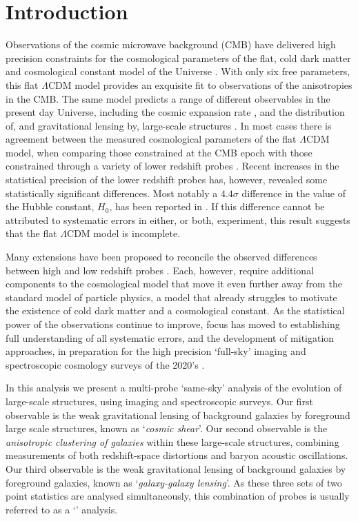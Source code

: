 \section{Introduction}
\label{sec:intro}

Observations of the cosmic microwave background (CMB) have delivered high precision
constraints for the cosmological parameters of the flat, cold dark
matter and cosmological constant model of the Universe
\citep[$\Lambda$CDM,][]{planck/etal:2018}.  With only six free
parameters, this flat $\Lambda$CDM model provides an exquisite fit to observations of
the anisotropies in the CMB.    The same model predicts a range of
different observables in the present day Universe, including the cosmic expansion rate \citep{weinberg/1972}, and the
distribution of, and gravitational lensing by, large-scale
structures \citep{peebles/1980,bartelmann/schneider:2001,eisenstein/etal:2005}.  
In most cases there
is agreement between the measured cosmological parameters of the flat $\Lambda$CDM model, when comparing those
constrained at the CMB epoch with those constrained through a variety of
lower redshift probes \citep[see the discussion in][and references
therein]{planck/etal:2018}.   Recent increases in the statistical
precision of the lower redshift probes has,
however, revealed some statistically significant differences.  Most
notably a $4.4\sigma$ difference in the value of the Hubble constant,
$H_0$, has been reported in \citet{riess/etal:2019}.  If this difference cannot be
attributed to systematic errors in either, or both, experiment, this result
suggests that the flat $\Lambda$CDM model is incomplete.

Many
extensions have been proposed to reconcile the observed differences between
high and low redshift probes \citep[see for
example][]{poulin/etal:2018,divalentino/etal:2020}.  Each, however, require
additional components
to the cosmological model that move it even further away from the
standard model of particle physics, a model that already struggles to motivate
the existence of cold dark matter and a cosmological constant.  
As the statistical power of the observations continue to improve, focus has moved to establishing
full understanding of all systematic errors, and the development of mitigation approaches, 
in preparation for the high precision `full-sky' imaging and spectroscopic
cosmology surveys of the 2020's \citep[Euclid,][]{laureijs/etal:2011,lsst/etal:2009,DESI/etal:2016}.

In this analysis we present a multi-probe `same-sky' analysis of the
evolution of large-scale structures, using imaging and spectroscopic surveys.
Our first observable is the weak gravitational lensing of background
galaxies by foreground large scale
structures, 
known as `{\it cosmic shear}'.    Our second
observable is the {\it anisotropic clustering of galaxies} within these
large-scale structures, combining measurements of both redshift-space
distortions and baryon acoustic
oscillations.   Our third observable is the weak gravitational lensing of background
galaxies by foreground galaxies, known as
`{\it galaxy-galaxy lensing}'.   As these three sets of two point
statistics are analysed simultaneously, this combination of probes
is usually referred to as a `\tttp' analysis. 

